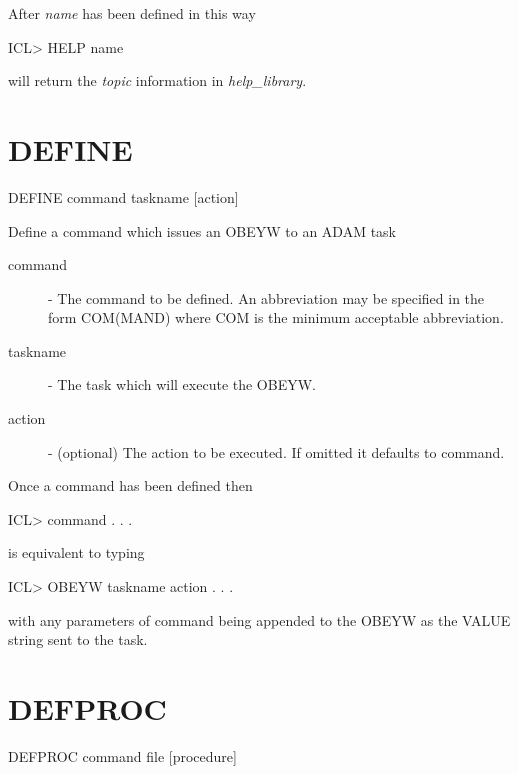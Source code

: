 \documentclass[twoside,11pt,nolof,chapters]{starlink}
\begin{document}
After \emph{name} has been defined in this way
\begin{terminalv}

  ICL> HELP name

\end{terminalv}
will return the \emph{topic}  information in \emph{help\_library}.

\section{DEFINE\label{DEFINE}}

   DEFINE \hspace{.5cm} command \hspace{.5cm} taskname \hspace{.5cm} [action]

 Define a command which issues an OBEYW to an ADAM task

\begin{description}

\item[command] - The command to be defined. An abbreviation
              may be specified in the form COM(MAND) where
              COM is the minimum acceptable abbreviation.

\item[taskname] - The task which will execute the OBEYW.

\item[action] - (optional)  The action to be executed. If
              omitted it defaults to command.

\end{description}
Once a command has been defined then
\begin{terminalv}
    ICL> command . . .
\end{terminalv}
is equivalent to typing
\begin{terminalv}
    ICL> OBEYW taskname action . . .
\end{terminalv}
with any parameters of command being appended to the OBEYW as the VALUE
string sent to the task.

\section{DEFPROC\label{DEFPROC}}

   DEFPROC \hspace{.5cm} command \hspace{.5cm} file \hspace{.5cm} [procedure]
\end{document}
